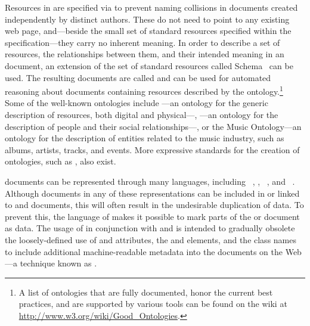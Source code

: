 Resources in  are specified via  to prevent naming
collisions in  documents created independently by distinct authors.
These  do not need to point to any existing web page, and---beside
the small set of standard resources specified within the 
specification---they carry no inherent meaning. In order to describe a set of
resources, the relationships between them, and their intended meaning in an
 document, an extension of the set of standard resources called
 Schema~\cite{brickley04} can be used. The resulting documents
are called   and can be
used for automated reasoning about  documents containing resources
described by the ontology.\footnote{
  A list of ontologies that are fully documented, honor the current best
  practices, and are supported by various tools can be found on the
   wiki at \url{http://www.w3.org/wiki/Good_Ontologies}.
} Some of the well-known ontologies include ---an ontology for the
generic description of resources, both digital and physical---,
---an ontology for the description of people and their social
relationships---, or the Music Ontology---an ontology for the description of
entities related to the music industry, such as albums, artists, tracks, and
events. More expressive standards for the creation of ontologies, such as
, also exist.

 documents can be represented through many languages, including
~\cite{lassira99}, ,
~\cite{beckett14:turtle}, and ~\cite{beckett14:nt}.
Although  documents in any of these representations can be
included in or linked to  and  documents, this
will often result in the undesirable duplication of data. To prevent this, the
language of  makes it possible to mark parts of the
 or  document as  data. The usage
of  in conjunction with  and  is
intended to gradually obsolete the loosely-defined use of  and
 attributes, the  and  elements,
and the  class names to include additional machine-readable metadata
into the documents on the Web---a technique known as .

\begin{figure}
  \label{fig:rdf-doc}
\end{figure}

